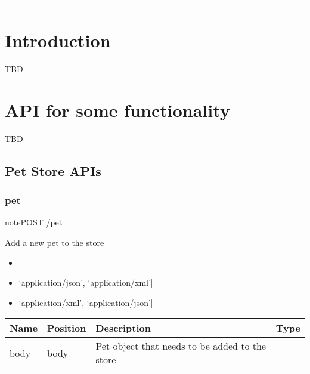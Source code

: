 \documentclass[letterpaper,10pt,english]{sphinxmanual}
\begin{document}
\bigskip\hrule\bigskip



\section{Introduction}
\label{\detokenize{dev-guide:introduction}}
TBD


\section{API for some functionality}
\label{\detokenize{dev-guide:api-for-some-functionality}}
TBD


\subsection{Pet Store APIs}
\label{\detokenize{dev-guide:pet-store-apis}}

\subsubsection{pet}
\label{\detokenize{dev-guide:pet}}
\begin{sphinxadmonition}{note}{POST /pet}

Add a new pet to the store\begin{itemize}
\item {} 

\item {} 
\sphinxstylestrong{Consumes: 
}{[}‘application/json’, ‘application/xml’{]}

\item {} 
\sphinxstylestrong{Produces: 
}{[}‘application/xml’, ‘application/json’{]}

\end{itemize}




\begin{savenotes}\sphinxattablestart
\centering
\begin{tabulary}{\linewidth}[t]{|T|T|T|T|}
\hline
\sphinxstyletheadfamily 
Name
&\sphinxstyletheadfamily 
Position
&\sphinxstyletheadfamily 
Description
&\sphinxstyletheadfamily 
Type
\\
\hline
body
&
body
&
Pet object that needs to be added to the store
&

\\
\hline
\end{tabulary}
\par
\sphinxattableend\end{savenotes}


\end{sphinxadmonition}
\end{document}
